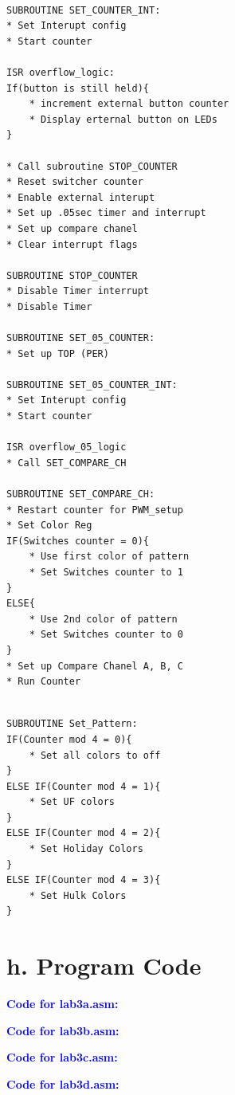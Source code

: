 \documentclass[11pt]{article}
\theoremstyle{plain}
\theoremstyle{definition}
\begin{document}
\begin{tcolorbox}
\begin{verbatim}

SUBROUTINE SET_COUNTER_INT:
* Set Interupt config
* Start counter

ISR overflow_logic:
If(button is still held){
	* increment external button counter
	* Display erternal button on LEDs 
}

* Call subroutine STOP_COUNTER
* Reset switcher counter
* Enable external interupt
* Set up .05sec timer and interrupt
* Set up compare chanel
* Clear interrupt flags

SUBROUTINE STOP_COUNTER
* Disable Timer interrupt
* Disable Timer

SUBROUTINE SET_05_COUNTER:
* Set up TOP (PER)

SUBROUTINE SET_05_COUNTER_INT:
* Set Interupt config
* Start counter

ISR overflow_05_logic	
* Call SET_COMPARE_CH

SUBROUTINE SET_COMPARE_CH:
* Restart counter for PWM_setup
* Set Color Reg
IF(Switches counter = 0){
	* Use first color of pattern
	* Set Switches counter to 1
}
ELSE{
	* Use 2nd color of pattern
	* Set Switches counter to 0
}	
* Set up Compare Chanel A, B, C
* Run Counter
\end{verbatim}
\end{tcolorbox}

\begin{tcolorbox}
\begin{verbatim}

SUBROUTINE Set_Pattern:
IF(Counter mod 4 = 0){
	* Set all colors to off
}
ELSE IF(Counter mod 4 = 1){
	* Set UF colors
}
ELSE IF(Counter mod 4 = 2){
	* Set Holiday Colors
}
ELSE IF(Counter mod 4 = 3){
	* Set Hulk Colors
}
\end{verbatim}
\end{tcolorbox}







\newpage
\section*{h. Program Code}
\textbf{\textcolor{blue}{Code for lab3a.asm:}}

\newpage
\textbf{\textcolor{blue}{Code for lab3b.asm:}}

\newpage
\textbf{\textcolor{blue}{Code for lab3c.asm:}}

\newpage
\textbf{\textcolor{blue}{Code for lab3d.asm:}}

\end{document}
